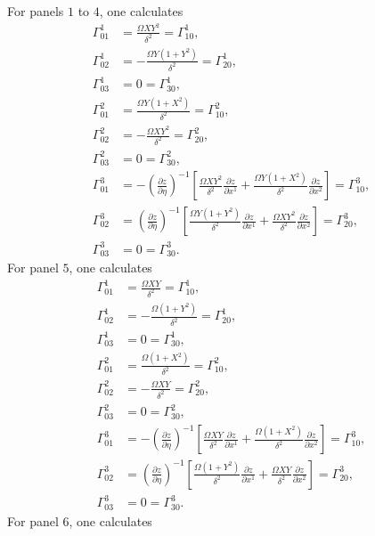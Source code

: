 \documentclass{article}
\begin{document}
For panels $1$ to $4$, one calculates
\begin{align}
\Gamma^1_{01}&=\frac{\Omega XY^2}{\delta^2}=\Gamma^1_{10}, \\
\Gamma^1_{02}&=-\frac{\Omega Y(1+Y^2)}{\delta^2}=\Gamma^1_{20}, \\
\Gamma^1_{03}&=0=\Gamma^1_{30}, \\
\Gamma^2_{01}&=\frac{\Omega Y(1+X^2)}{\delta^2}=\Gamma^2_{10}, \\
\Gamma^2_{02}&=-\frac{\Omega XY^2}{\delta^2}=\Gamma^2_{20}, \\
\Gamma^2_{03}&=0=\Gamma^2_{30}, \\
\Gamma^3_{01}&=-\left(\frac{\partial z}{\partial \eta}\right)^{-1}\left[ \frac{\Omega XY^2}{\delta^2} \frac{\partial z}{\partial x^1}+ \frac{\Omega Y(1+X^2)}{\delta^2} \frac{\partial z}{\partial x^2}  \right]=\Gamma^3_{10}, \\
\Gamma^3_{02}&=\left(\frac{\partial z}{\partial \eta}\right)^{-1}\left[ \frac{\Omega Y(1+Y^2)}{\delta^2} \frac{\partial z}{\partial x^1}+\frac{\Omega XY^2}{\delta^2}\frac{\partial z}{\partial x^2}  \right]=\Gamma^3_{20}, \\
\Gamma^3_{03}&=0=\Gamma^3_{30}.
\end{align}
For panel $5$, one calculates
\begin{align}
\Gamma^1_{01}&=\frac{\Omega XY}{\delta^2}=\Gamma^1_{10}, \\
\Gamma^1_{02}&=-\frac{\Omega (1+Y^2)}{\delta^2}=\Gamma^1_{20}, \\
\Gamma^1_{03}&=0=\Gamma^1_{30}, \\
\Gamma^2_{01}&=\frac{\Omega (1+X^2)}{\delta^2}=\Gamma^2_{10}, \\
\Gamma^2_{02}&=-\frac{\Omega XY}{\delta^2}=\Gamma^2_{20}, \\
\Gamma^2_{03}&=0=\Gamma^2_{30}, \\
\Gamma^3_{01}&=-\left(\frac{\partial z}{\partial \eta}\right)^{-1}\left[ \frac{\Omega XY}{\delta^2} \frac{\partial z}{\partial x^1}+ \frac{\Omega (1+X^2)}{\delta^2} \frac{\partial z}{\partial x^2}  \right]=\Gamma^3_{10}, \\
\Gamma^3_{02}&=\left(\frac{\partial z}{\partial \eta}\right)^{-1}\left[ \frac{\Omega (1+Y^2)}{\delta^2} \frac{\partial z}{\partial x^1}+\frac{\Omega XY}{\delta^2}\frac{\partial z}{\partial x^2}  \right]=\Gamma^3_{20}, \\
\Gamma^3_{03}&=0=\Gamma^3_{30}.
\end{align}
For panel $6$, one calculates
\end{document}
